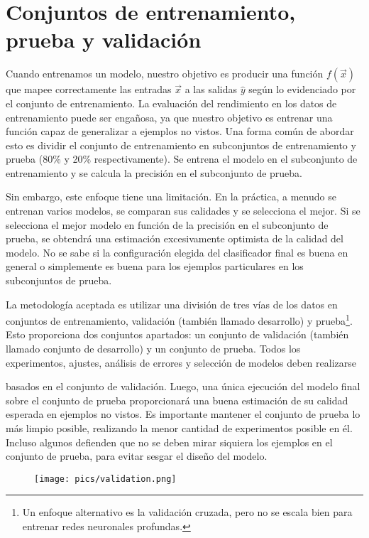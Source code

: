 \section{Conjuntos de entrenamiento, prueba y validación}
Cuando entrenamos un modelo, nuestro objetivo es producir una función $f(\vec{x})$ que mapee correctamente las entradas $\vec{x}$ a las salidas $\hat{y}$ según lo evidenciado por el conjunto de entrenamiento. La evaluación del rendimiento en los datos de entrenamiento puede ser engañosa, ya que nuestro objetivo es entrenar una función capaz de generalizar a ejemplos no vistos. Una forma común de abordar esto es dividir el conjunto de entrenamiento en subconjuntos de entrenamiento y prueba (80\% y 20\% respectivamente). Se entrena el modelo en el subconjunto de entrenamiento y se calcula la precisión en el subconjunto de prueba.

Sin embargo, este enfoque tiene una limitación. En la práctica, a menudo se entrenan varios modelos, se comparan sus calidades y se selecciona el mejor. Si se selecciona el mejor modelo en función de la precisión en el subconjunto de prueba, se obtendrá una estimación excesivamente optimista de la calidad del modelo. No se sabe si la configuración elegida del clasificador final es buena en general o simplemente es buena para los ejemplos particulares en los subconjuntos de prueba.

La metodología aceptada es utilizar una división de tres vías de los datos en conjuntos de entrenamiento, validación (también llamado desarrollo) y prueba\footnote{Un enfoque alternativo es la validación cruzada, pero no se escala bien para entrenar redes neuronales profundas.}. Esto proporciona dos conjuntos apartados: un conjunto de validación (también llamado conjunto de desarrollo) y un conjunto de prueba. Todos los experimentos, ajustes, análisis de errores y selección de modelos deben realizarse

basados en el conjunto de validación. Luego, una única ejecución del modelo final sobre el conjunto de prueba proporcionará una buena estimación de su calidad esperada en ejemplos no vistos. Es importante mantener el conjunto de prueba lo más limpio posible, realizando la menor cantidad de experimentos posible en él. Incluso algunos defienden que no se deben mirar siquiera los ejemplos en el conjunto de prueba, para evitar sesgar el diseño del modelo.

\begin{figure}[htb]
	\centering
	 \texttt{[image: pics/validation.png]}
\end{figure}

